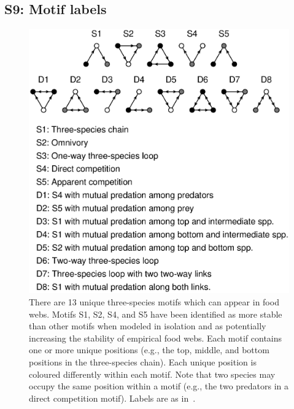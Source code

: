 \documentclass[12pt]{article}
\begin{document}
\begin{spacing}{2.0}


\section*{S9: Motif labels}

	\begin{figure}[hb!]
		\caption{There are 13 unique three-species motifs which can appear in food webs. Motifs S1, S2, S4, and S5 have been identified as more stable than other motifs when modeled in isolation and as potentially increasing the stability of empirical food webs. Each motif contains one or more unique positions (e.g., the top, middle, and bottom positions in the three-species chain). Each unique position is coloured differently within each motif. Note that two species may occupy the same position within a motif (e.g., the two predators in a direct competition motif). Labels are as in~\citet{Stouffer2007}.}
		\label{motifs}
		\includegraphics[width=.8\textwidth]{figures/motifs.eps}
		\end{figure}

\end{spacing}
\clearpage

     
\end{document}
